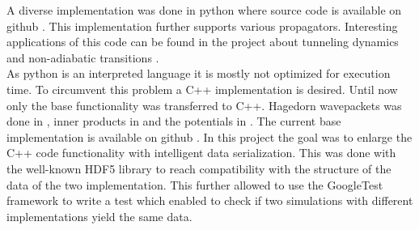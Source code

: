 A diverse implementation was done in python \cite{B_master_thesis} where source code is available on github \cite{waveblocksnd}. This implementation further supports various propagators. Interesting applications of this code can be found in the project about tunneling dynamics \cite{GHJ_tunneling_spawning} and non-adiabatic transitions \cite{BGH_natac}.\\

As python is an interpreted language it is mostly not optimized for execution time. To circumvent this problem a C++ implementation is desired. Until now only the base functionality was transferred to C++. Hagedorn wavepackets was done in \cite{bt_michajab}, inner products in \cite{st_benedekv} and the potentials in \cite{bt_lionelm}. The current base implementation is available on github \cite{libwaveblocks}. In this project the goal was to enlarge the C++ code functionality with intelligent data serialization. This was done with the well-known HDF5 library to reach compatibility with the structure of the data of the two implementation. This further allowed to use the GoogleTest framework to write a test which enabled to check if two simulations with different implementations yield the same data.